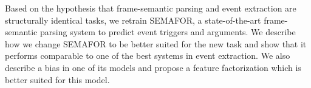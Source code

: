 Based on the hypothesis that frame-semantic parsing and event extraction are structurally identical tasks, we retrain SEMAFOR, a state-of-the-art frame-semantic parsing system to predict event triggers and arguments. We describe how we change SEMAFOR to be better suited for the new task and show that it performs comparable to one of the best systems in event extraction. We also describe a bias in one of its models and propose a feature factorization which is better suited for this model.
